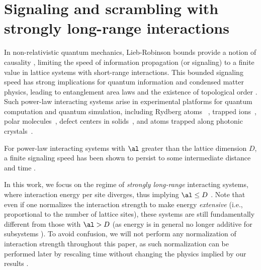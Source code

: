\chapter{Signaling and scrambling with strongly long-range interactions}
In non-relativistic quantum mechanics, Lieb-Robinson bounds provide a notion of causality \cite{LR}, limiting the speed of information propagation (or signaling) to a finite value in lattice systems with short-range interactions. This bounded signaling speed has strong implications for quantum information and condensed matter physics, leading to entanglement area laws \cite{Hastings07} and the existence of topological order \cite{BravyiHM10}.
Such power-law interacting systems arise in experimental platforms for quantum computation and quantum simulation, including Rydberg atoms ~\cite{Saffman10}, trapped ions~\cite{Britton12}, polar molecules~\cite{Yan13}, defect centers in solids~\cite{Yao12}, and atoms trapped along photonic crystals~\cite{Douglas15}.

For power-law interacting systems with $\al$ greater than the lattice dimension $D$, a finite signaling speed has been shown to persist to some intermediate distance and time \cite{Gong14}.


In this work, we focus on the regime of \emph{strongly long-range} interacting systems, where interaction energy per site diverges, thus implying $\al\le D$ \cite{Kastner11,Kastner12, Storch15, Kastner17}.
Note that even if one normalizes the interaction strength to make energy \emph{extensive} (i.e., proportional to the number of lattice sites), these systems are still fundamentally different from those with $\al >D$ (as energy is in general no longer additive for subsystems \cite{Dauxois}).
To avoid confusion, we will not perform any normalization of interaction strength throughout this paper, as such normalization can be performed later by rescaling time  without changing the physics implied by our results \cite{Storch15}.

